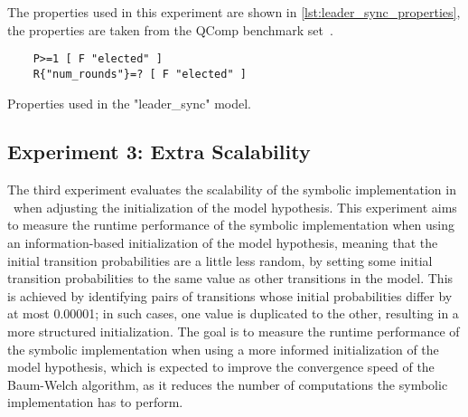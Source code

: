 The properties used in this experiment are shown in \autoref{lst:leader_sync_properties}, the properties are taken from the QComp benchmark set~\cite{hartmanns2019quantitative}.
\begin{listing}
    \begin{verbatim}
    P>=1 [ F "elected" ]
    R{"num_rounds"}=? [ F "elected" ]
    \end{verbatim}
    \caption{Properties used in the "leader\_sync" model.}
    \label{lst:leader_sync_properties}
\end{listing}

\subsection{Experiment 3: Extra Scalability}\label{sec:exp_extra_scalability}
The third experiment evaluates the scalability of the symbolic implementation in \JajapyTwo\ when adjusting the initialization of the model hypothesis.
This experiment aims to measure the runtime performance of the symbolic implementation when using an information-based initialization of the model hypothesis, meaning that the initial transition probabilities are a little less random, by setting some initial transition probabilities to the same value as other transitions in the model.
This is achieved by identifying pairs of transitions whose initial probabilities differ by at most 0.00001; in such cases, one value is duplicated to the other, resulting in a more structured initialization.
The goal is to measure the runtime performance of the symbolic implementation when using a more informed initialization of the model hypothesis, which is expected to improve the convergence speed of the Baum-Welch algorithm, as it reduces the number of computations the symbolic implementation has to perform.


